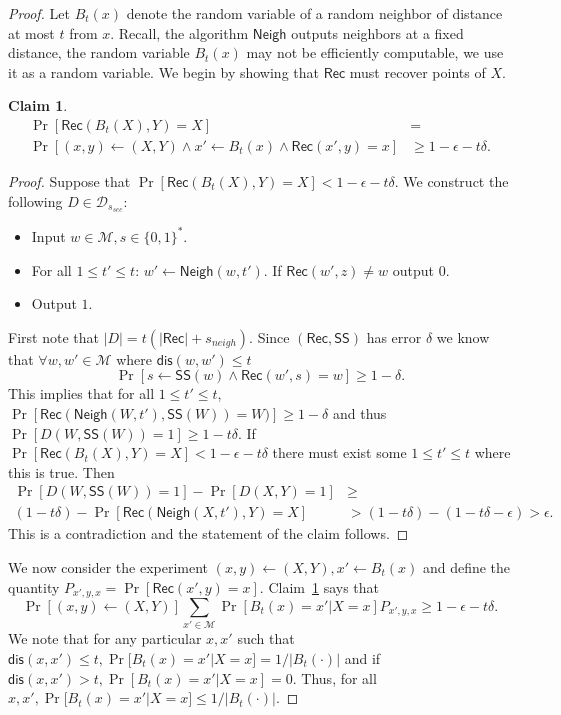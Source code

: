 \documentclass[11pt]{article}
\newcommand{\clref}[1]{\mbox{Claim~\ref{#1}}}
\newcommand{\class}[1]{{\ensuremath{\mathsf{#1}}}}
\newcommand{\sketch}{\ensuremath{\class{SS}}\xspace}
\newcommand{\rec}{\ensuremath{\class{Rec}}\xspace}
\newcommand{\zo}{\ensuremath{\{0, 1\}}}
\newcommand{\neigh}{\ensuremath{\class{Neigh}}\xspace}
\newcommand{\dis}{\ensuremath{\mathsf{dis}}}
\newtheorem{claim}[theorem]{Claim}
\begin{document}
\begin{proof}
Let $B_t(x)$ denote the random variable of a random neighbor of distance at most $t$ from $x$.  Recall, the algorithm $\neigh$ outputs neighbors at a fixed distance, the random variable $B_t(x)$ may not be efficiently computable, we use it as a random variable.
We begin by showing that \rec must recover points of $X$.  
\begin{claim}
\label{clm:y is recoverable}
\begin{align*}
\Pr[\rec(B_t(X), Y) = X]&=\\
\Pr[(x, y)\leftarrow (X, Y) \wedge x'\leftarrow B_t(x) \wedge \rec(x', y) = x] &\geq 1-\epsilon -t\delta.
\end{align*}
\end{claim}
\begin{proof}
Suppose that $\Pr[\rec(B_t(X), Y) = X]<1-\epsilon -t\delta$.  We construct the following $D\in\mathcal{D}_{s_{sec}}$:
\begin{itemize}
\item Input $w\in \mathcal{M}, s\in\zo^*$.
\item For all $1\leq t'\leq t$: 
\subitem  $w'\leftarrow \neigh(w, t')$.
\subitem If $\rec(w', z) \neq  w$ output $0$.
\item Output $1$.
\end{itemize}
First note that $|D| = t( |\rec|+ s_{neigh} )$.  Since $(\rec, \sketch)$ has error $\delta$ we know that $\forall w, w'\in \mathcal{M}$ where $\dis(w, w')\leq t$ \[ \Pr[s\leftarrow \sketch(w) \wedge \rec(w', s) =  w] \geq 1-\delta.\]  This implies that for all $1\leq t'\leq t$, $\Pr[\rec(\neigh(W, t'), \sketch(W) )= W)  ]\geq 1-\delta$ and thus $\Pr[D(W, \sketch(W)) = 1]\geq 1-t\delta$.  If $\Pr[\rec(B_t(X), Y) = X] < 1-\epsilon -t\delta$ there must exist some $1\leq t'\leq t$ where this is true.  Then 
\begin{align*}
\Pr[D(W, \sketch(W)) = 1]  - \Pr[D(X, Y)=1] &\geq\\
(1-t\delta) - \Pr[\rec(\neigh(X, t'), Y) = X] &> (1-t\delta)-(1-t\delta - \epsilon)>\epsilon.
\end{align*}
This is a contradiction and the statement of the claim follows.
\end{proof}
We now consider the experiment $(x, y)\leftarrow (X, Y), x'\leftarrow B_t(x)$ and define the quantity $P_{x' , y,x} = \Pr[\rec(x', y) =x]$.  \clref{clm:y is recoverable} says that 
\[
 \Pr[(x, y)\leftarrow (X, Y)] \sum_{x'\in \mathcal{M}} \Pr[B_t(x) =x' | X = x] P_{x',  y,x} \geq 1-\epsilon - t\delta.
\]
We note that for any particular $x, x'$ such that $\dis(x, x')\leq t, \Pr[B_t(x) = x' | X=x] = 1/|B_t(\cdot)|$ and if $\dis(x, x')>t, \Pr[B_t(x) = x' | X=x] = 0$.  Thus, for all $x, x', \Pr[B_t(x) = x' | X=x] \leq 1/|B_t(\cdot)|$.

\end{proof}
\end{document}
